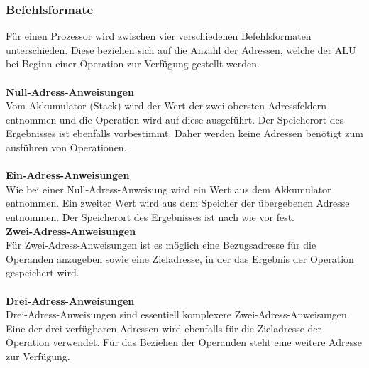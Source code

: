 \documentclass[12pt]{article}
\begin{document}
\subsubsection{Befehlsformate}
Für einen Prozessor wird zwischen vier verschiedenen Befehlsformaten unterschieden. Diese beziehen sich auf die Anzahl der Adressen, welche der ALU bei Beginn einer Operation zur Verfügung gestellt werden.\\ \\
\textbf{Null-Adress-Anweisungen}\\
Vom Akkumulator (Stack) wird der Wert der zwei obersten Adressfeldern entnommen und die Operation wird auf diese ausgeführt. Der Speicherort des Ergebnisses ist ebenfalls vorbestimmt. Daher werden keine Adressen benötigt zum ausführen von Operationen.\\ \\
\textbf{Ein-Adress-Anweisungen}\\
Wie bei einer Null-Adress-Anweisung wird ein Wert aus dem Akkumulator entnommen. Ein zweiter Wert wird aus dem Speicher der übergebenen Adresse entnommen. Der Speicherort des Ergebnisses ist nach wie vor fest.\\
\textbf{Zwei-Adress-Anweisungen}\\
Für Zwei-Adress-Anweisungen ist es möglich eine Bezugsadresse für die Operanden anzugeben sowie eine Zieladresse, in der das Ergebnis der Operation gespeichert wird.\\ \\
\textbf{Drei-Adress-Anweisungen}\\
Drei-Adress-Anweisungen sind essentiell komplexere Zwei-Adress-Anweisungen. Eine der drei verfügbaren Adressen wird ebenfalls für die Zieladresse der Operation verwendet. Für das Beziehen der Operanden steht eine weitere Adresse zur Verfügung.\\
\end{document}

